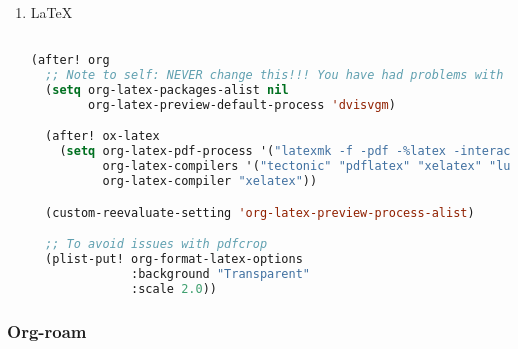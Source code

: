 \documentclass[11pt]{article}
\begin{document}
\begin{enumerate}
  \item LaTeX
  \label{sec:latex-1}

  \begin{lstlisting}[language=Lisp]%! Someone please complete this list for me

(after! org
  ;; Note to self: NEVER change this!!! You have had problems with uncompilable documents when you changed the default preamble in the past!!
  (setq org-latex-packages-alist nil
        org-latex-preview-default-process 'dvisvgm)

  (after! ox-latex
    (setq org-latex-pdf-process '("latexmk -f -pdf -%latex -interaction=nonstopmode -output-directory=%o %f")
          org-latex-compilers '("tectonic" "pdflatex" "xelatex" "lualatex")
          org-latex-compiler "xelatex"))

  (custom-reevaluate-setting 'org-latex-preview-process-alist)

  ;; To avoid issues with pdfcrop
  (plist-put! org-format-latex-options
              :background "Transparent"
              :scale 2.0))
\end{lstlisting}
\end{enumerate}

\subsubsection{Org-roam}
\label{sec:org-roam}
\end{document}

